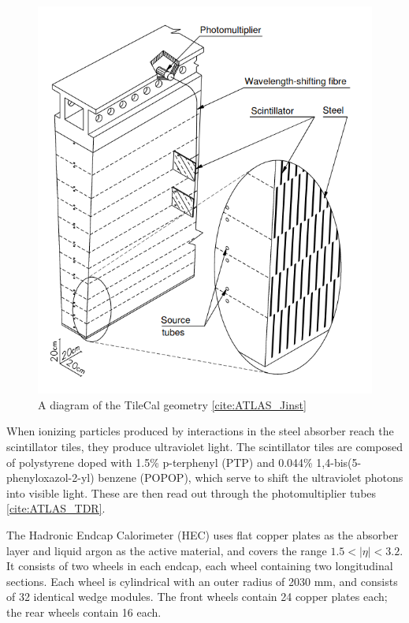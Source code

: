 \begin{figure}
  \includegraphics[width=\linewidth]{figures/detector_chapter/TileCal.png}
  \caption{A diagram of the TileCal geometry \ref{cite:ATLAS_Jinst}}
  \label{fig:TileCalDiagram}
\end{figure}

When ionizing particles produced by interactions in the steel absorber reach the scintillator tiles, they produce ultraviolet light. The scintillator tiles are composed of polystyrene doped with 1.5\%  p-terphenyl (PTP) and 0.044\% 1,4-bis(5-phenyloxazol-2-yl) benzene (POPOP), which serve to shift the ultraviolet photons into visible light. These are then read out through the photomultiplier tubes \ref{cite:ATLAS_TDR}.

The Hadronic Endcap Calorimeter (HEC) uses flat copper plates as the absorber layer and liquid argon as the active material, and covers the range  $1.5 < | \eta | < 3.2 $. It consists of two wheels in each endcap, each wheel containing two longitudinal sections. Each wheel is cylindrical with an outer radius of 2030 mm, and consists of 32 identical wedge modules. The front wheels contain 24 copper plates each; the rear wheels contain 16 each.

